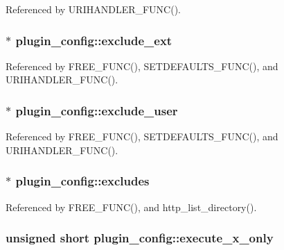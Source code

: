 Referenced by U\-R\-I\-H\-A\-N\-D\-L\-E\-R\-\_\-\-F\-U\-N\-C().

\hypertarget{structplugin__config_a2cf350729e68bc790cdf2ecfa10107b5}{
\subsubsection[{exclude\-\_\-ext}]{$\ast$ plugin\-\_\-config\-::exclude\-\_\-ext}}\label{structplugin__config_a2cf350729e68bc790cdf2ecfa10107b5}


Referenced by F\-R\-E\-E\-\_\-\-F\-U\-N\-C(), S\-E\-T\-D\-E\-F\-A\-U\-L\-T\-S\-\_\-\-F\-U\-N\-C(), and U\-R\-I\-H\-A\-N\-D\-L\-E\-R\-\_\-\-F\-U\-N\-C().

\hypertarget{structplugin__config_a3ca541f13e7d19d371ecd4af89626039}{
\subsubsection[{exclude\-\_\-user}]{$\ast$ plugin\-\_\-config\-::exclude\-\_\-user}}\label{structplugin__config_a3ca541f13e7d19d371ecd4af89626039}


Referenced by F\-R\-E\-E\-\_\-\-F\-U\-N\-C(), S\-E\-T\-D\-E\-F\-A\-U\-L\-T\-S\-\_\-\-F\-U\-N\-C(), and U\-R\-I\-H\-A\-N\-D\-L\-E\-R\-\_\-\-F\-U\-N\-C().

\hypertarget{structplugin__config_a8d5a7a71f3091b091a37b08f5481b16f}{
\subsubsection[{excludes}]{$\ast$ plugin\-\_\-config\-::excludes}}\label{structplugin__config_a8d5a7a71f3091b091a37b08f5481b16f}


Referenced by F\-R\-E\-E\-\_\-\-F\-U\-N\-C(), and http\-\_\-list\-\_\-directory().

\hypertarget{structplugin__config_ade3cfcb6c674c770a6e7c5c352476383}{
\subsubsection[{execute\-\_\-x\-\_\-only}]{\setlength{\rightskip}{0pt plus 5cm}unsigned short plugin\-\_\-config\-::execute\-\_\-x\-\_\-only}}\label{structplugin__config_ade3cfcb6c674c770a6e7c5c352476383}


